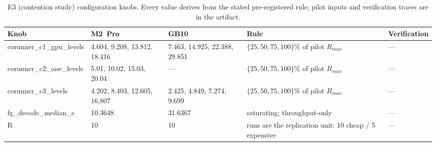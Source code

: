 \begin{table}[t]\centering\small
\caption{E3 (contention study) configuration knobs. Every value derives from the stated pre-registered rule; pilot inputs and verification traces are in the artifact.}
\label{tab:knobs-e3}
\begin{tabular}{lllll}
\toprule
Knob & M2~Pro & GB10 & Rule & Verification \\
\midrule
corunner\_c1\_gpu\_levels & 4.604, 9.208, 13.812, 18.416 & 7.463, 14.925, 22.388, 29.851 & $\{25,50,75,100\}\%$ of pilot $R_{max}$ & --- \\
corunner\_c2\_ane\_levels & 5.01, 10.02, 15.03, 20.04 & --- & $\{25,50,75,100\}\%$ of pilot $R_{max}$ & --- \\
corunner\_c3\_levels & 4.202, 8.403, 12.605, 16.807 & 2.425, 4.849, 7.274, 9.699 & $\{25,50,75,100\}\%$ of pilot $R_{max}$ & --- \\
fg\_decode\_median\_s & 10.3648 & 31.6367 & saturating; throughput-only & --- \\
R & 10 & 10 & runs are the replication unit: 10 cheap / 5 expensive & --- \\
\bottomrule
\end{tabular}
\end{table}

